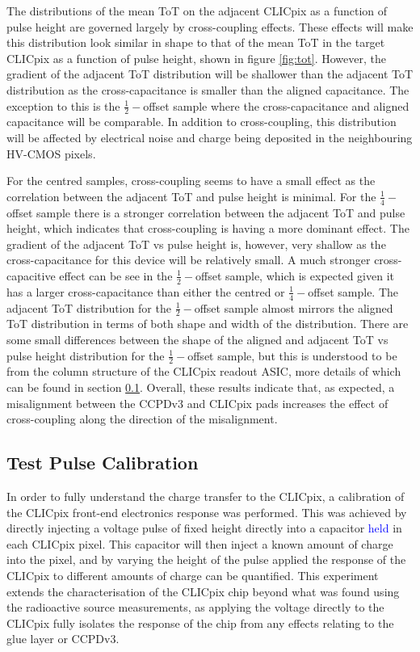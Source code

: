 The distributions of the mean ToT on the adjacent CLICpix as a function of pulse height are governed largely by cross-coupling effects.  These effects will make this distribution look similar in shape to that of the mean ToT in the target CLICpix as a function of pulse height, shown in figure \ref{fig:tot}.  However, the gradient of the adjacent ToT distribution will be shallower than the adjacent ToT distribution as the cross-capacitance is smaller than the aligned capacitance.  The exception to this is the $\frac{1}{2}-$offset sample where the cross-capacitance and aligned capacitance will be comparable.  In addition to cross-coupling, this distribution will be affected by electrical noise and charge being deposited in the neighbouring HV-CMOS pixels.  

For the centred samples, cross-coupling seems to have a small effect as the correlation between the adjacent ToT and pulse height is minimal.  For the $\frac{1}{4}-$offset sample there is a stronger correlation between the adjacent ToT and pulse height, which indicates that cross-coupling is having a more dominant effect.  The gradient of the adjacent ToT vs pulse height is, however, very shallow as the cross-capacitance for this device will be relatively small.  A much stronger cross-capacitive effect can be see in the $\frac{1}{2}-$offset sample, which is expected given it has a larger cross-capacitance than either the centred or $\frac{1}{4}-$offset sample.  The adjacent ToT distribution for the $\frac{1}{2}-$offset sample almost mirrors the aligned ToT distribution in terms of both shape and width of the distribution.  There are some small differences between the shape of the aligned and adjacent ToT vs pulse height distribution for the $\frac{1}{2}-$offset sample, but this is understood to be from the column structure of the CLICpix readout ASIC, more details of which can be found in section \ref{sec:testpulsecalibration}.  Overall, these results indicate that, as expected, a misalignment between the CCPDv3 and CLICpix pads increases the effect of cross-coupling along the direction of the misalignment.


\subsection{Test Pulse Calibration}
\label{sec:testpulsecalibration}
In order to fully understand the charge transfer to the CLICpix, a calibration of the CLICpix front-end electronics response was performed.  This was achieved by directly injecting a voltage pulse of fixed height directly into a capacitor \textcolor{blue}{held} in each CLICpix pixel.  This capacitor will then inject a known amount of charge into the pixel, and by varying the height of the pulse applied the response of the CLICpix to different amounts of charge can be quantified.  This experiment extends the characterisation of the CLICpix chip beyond what was found using the radioactive source measurements, as applying the voltage directly to the CLICpix fully isolates the response of the chip from any effects relating to the glue layer or CCPDv3.  

